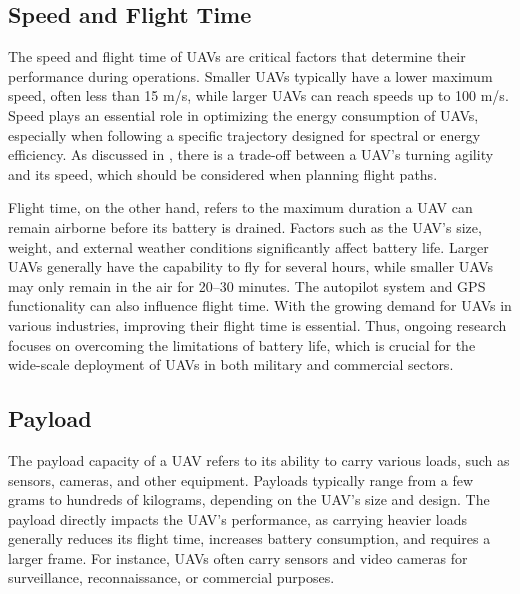 

\subsection{Speed and Flight Time}

The speed and flight time of UAVs are critical factors that determine their performance during operations. Smaller UAVs typically have a lower maximum speed, often less than 15 m/s, while larger UAVs can reach speeds up to 100 m/s. Speed plays an essential role in optimizing the energy consumption of UAVs, especially when following a specific trajectory designed for spectral or energy efficiency. As discussed in \cite{ref52}, there is a trade-off between a UAV's turning agility and its speed, which should be considered when planning flight paths.

\vspace{0.5cm}

Flight time, on the other hand, refers to the maximum duration a UAV can remain airborne before its battery is drained. Factors such as the UAV's size, weight, and external weather conditions significantly affect battery life. Larger UAVs generally have the capability to fly for several hours, while smaller UAVs may only remain in the air for 20–30 minutes. The autopilot system and GPS functionality can also influence flight time. With the growing demand for UAVs in various industries, improving their flight time is essential. Thus, ongoing research focuses on overcoming the limitations of battery life, which is crucial for the wide-scale deployment of UAVs in both military and commercial sectors.




\subsection{Payload}

The payload capacity of a UAV refers to its ability to carry various loads, such as sensors, cameras, and other equipment. Payloads typically range from a few grams to hundreds of kilograms, depending on the UAV's size and design. The payload directly impacts the UAV's performance, as carrying heavier loads generally reduces its flight time, increases battery consumption, and requires a larger frame. For instance, UAVs often carry sensors and video cameras for surveillance, reconnaissance, or commercial purposes.

